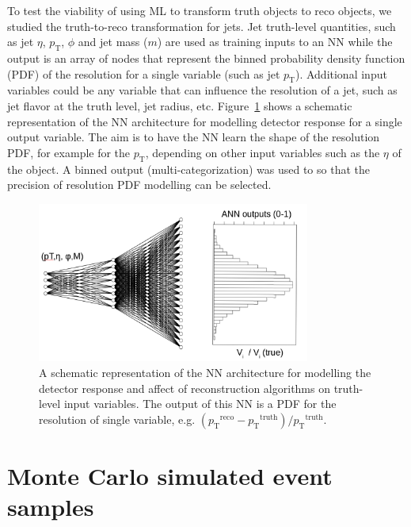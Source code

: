 \documentclass[showpacs,showkeys,preprint,prd,nofootinbib,linenumbers,12pt,superscriptaddress]{revtex4-1}
\def\pt{\ensuremath{p_{\mathrm{T}}}}
\def\ptRes{\ensuremath{(\pt^{\mathrm{reco}}-\pt^{\mathrm{truth}})/\pt^{\mathrm{truth}}}}
\begin{document}
To test the viability of using ML to transform truth objects to reco objects, we studied the truth-to-reco transformation for jets. Jet truth-level quantities, such as jet $\eta$, $\pt$, $\phi$ and jet mass ($m$) are used as training inputs to an NN while the output
is an array of nodes that represent the binned probability density function (PDF) of the resolution for a single variable (such as jet \pt). Additional input variables could be any variable that can influence the resolution of a jet, such as jet flavor at the truth level, jet radius, etc. Figure~\ref{ann_example} shows a schematic representation of the NN architecture for modelling detector response for a single output variable. The aim is to have the NN learn the shape of the resolution PDF, for example for the $\pt$, depending on other input variables such as the $\eta$ of the object. A binned output (multi-categorization) was used to so that the precision of resolution PDF modelling can be selected.

\begin{figure}[h]
  \includegraphics[width=0.8\textwidth]{figures/intro/nn_example.png}
  \caption{A schematic representation of the NN architecture for modelling the detector response and affect of reconstruction algorithms on truth-level input variables. The output of this NN is a PDF for the resolution of single variable, e.g. \ptRes.}
  \label{ann_example}
\end{figure}


\section{Monte Carlo simulated event samples}
\end{document}
